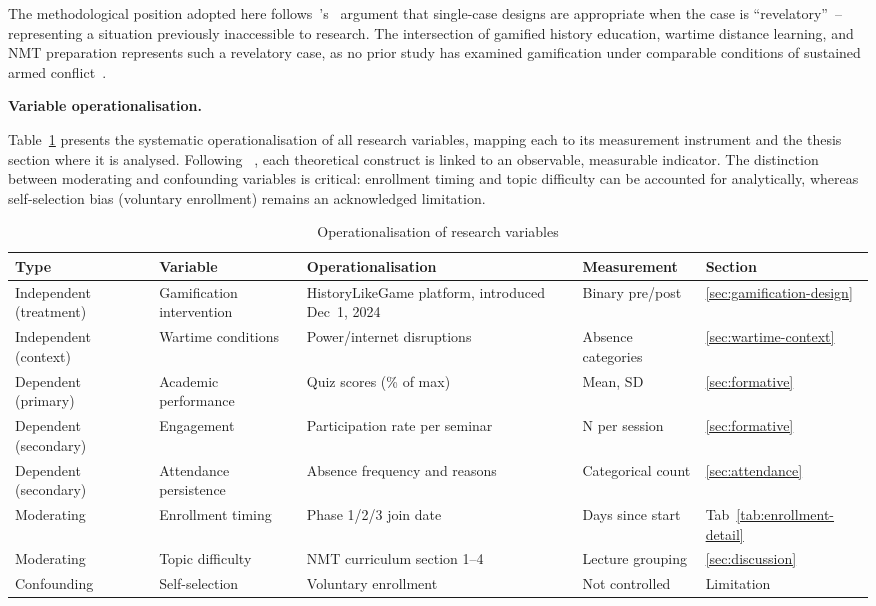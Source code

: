 The methodological position adopted here follows~\citeauthor{Yin2018}'s~\cite{Yin2018} argument that single-case designs are appropriate when the case is ``revelatory''~-- representing a situation previously inaccessible to research. The intersection of gamified history education, wartime distance learning, and NMT preparation represents such a revelatory case, as no prior study has examined gamification under comparable conditions of sustained armed conflict~\cite{Burde2017, Kirk2007}.

\textbf{Variable operationalisation.}

Table~\ref{tab:variable-operationalization} presents the systematic operationalisation of all research variables, mapping each to its measurement instrument and the thesis section where it is analysed. Following \citeauthor{CohenManionMorrison2018}~\cite{CohenManionMorrison2018}, each theoretical construct is linked to an observable, measurable indicator. The distinction between moderating and confounding variables is critical: enrollment timing and topic difficulty can be accounted for analytically, whereas self-selection bias (voluntary enrollment) remains an acknowledged limitation.

\begin{table}[!h]
\centering
\caption{Operationalisation of research variables}
\label{tab:variable-operationalization}
\footnotesize
\begin{tabularx}{\textwidth}{X X X X l}
\hline
\textbf{Type} & \textbf{Variable} & \textbf{Operationalisation} & \textbf{Measurement} & \textbf{Section} \\
\hline
Independent (treatment) & Gamification intervention & HistoryLikeGame platform, introduced Dec~1, 2024 & Binary pre/post & \ref{sec:gamification-design} \\
Independent (context) & Wartime conditions & Power/internet disruptions & Absence categories & \ref{sec:wartime-context} \\
Dependent (primary) & Academic performance & Quiz scores (\% of max) & Mean, SD & \ref{sec:formative} \\
Dependent (secondary) & Engagement & Participation rate per seminar & N per session & \ref{sec:formative} \\
Dependent (secondary) & Attendance persistence & Absence frequency and reasons & Categorical count & \ref{sec:attendance} \\
Moderating & Enrollment timing & Phase 1/2/3 join date & Days since start & Tab~\ref{tab:enrollment-detail} \\
Moderating & Topic difficulty & NMT curriculum section 1--4 & Lecture grouping & \ref{sec:discussion} \\
Confounding & Self-selection & Voluntary enrollment & Not controlled & Limitation \\
\hline
\end{tabularx}
\end{table}

